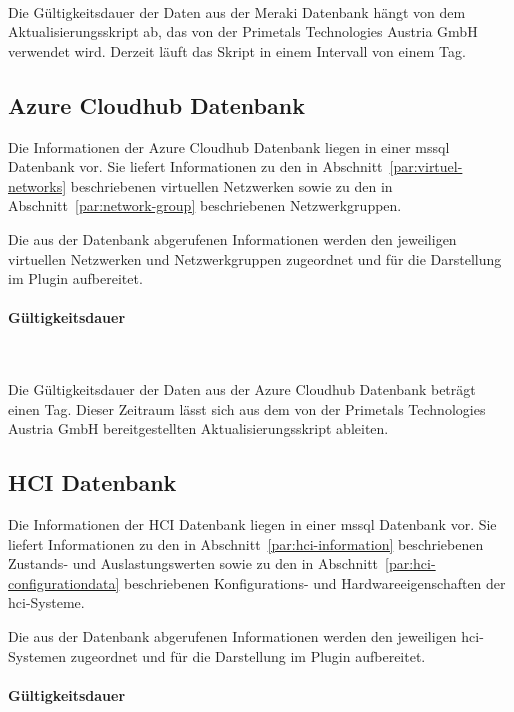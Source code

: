 ~

Die Gültigkeitsdauer der Daten aus der Meraki Datenbank hängt von dem
Aktualisierungsskript ab, das von der Primetals Technologies Austria GmbH
verwendet wird. Derzeit läuft das Skript in einem Intervall von einem Tag.

\subsection{Azure Cloudhub Datenbank}
\label{subsec:azure-cloudhub-db}

Die Informationen der Azure Cloudhub Datenbank liegen in einer \gls{mssql}
Datenbank vor. Sie liefert Informationen zu den in Abschnitt~\ref{par:virtuel-networks}
beschriebenen virtuellen Netzwerken sowie zu den in Abschnitt~\ref{par:network-group}
beschriebenen Netzwerkgruppen.

Die aus der Datenbank abgerufenen Informationen werden den jeweiligen
virtuellen Netzwerken und Netzwerkgruppen zugeordnet und für die Darstellung
im Plugin aufbereitet.

\paragraph{Gültigkeitsdauer}
\label{par:azure-cloudhub-validation-time}

~

Die Gültigkeitsdauer der Daten aus der Azure Cloudhub Datenbank beträgt
einen Tag. Dieser Zeitraum lässt sich aus dem von der Primetals
Technologies Austria GmbH bereitgestellten Aktualisierungsskript ableiten.

\subsection{HCI Datenbank}
\label{subsec:hci-db}

Die Informationen der HCI Datenbank liegen in einer \gls{mssql} Datenbank vor.
Sie liefert Informationen zu den in Abschnitt~\ref{par:hci-information} beschriebenen
Zustands- und Auslastungswerten sowie zu den in Abschnitt~\ref{par:hci-configurationdata}
beschriebenen Konfigurations- und Hardwareeigenschaften der \gls{hci}-Systeme.

Die aus der Datenbank abgerufenen Informationen werden den jeweiligen
\gls{hci}-Systemen zugeordnet und für die Darstellung im Plugin aufbereitet.

\paragraph{Gültigkeitsdauer}
\label{par:hci-db-validation-time}

